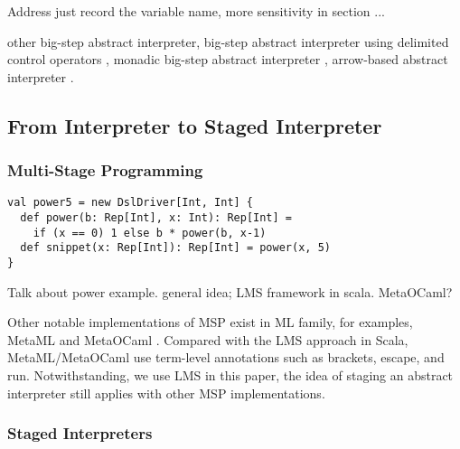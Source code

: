 Address just record the variable name, more sensitivity in section ...

other big-step abstract interpreter, 
big-step abstract interpreter using delimited control operators \cite{Wei:2018:RAA:3243631.3236800},
monadic big-step abstract interpreter \cite{DBLP:journals/pacmpl/DaraisLNH17},
arrow-based abstract interpreter \cite{Keidel:2018:CSP:3243631.3236767}.

\subsection{From Interpreter to Staged Interpreter} \label{stagedinterp}

\subsubsection{Multi-Stage Programming}
\begin{lstlisting}
val power5 = new DslDriver[Int, Int] {
  def power(b: Rep[Int], x: Int): Rep[Int] =
    if (x == 0) 1 else b * power(b, x-1)
  def snippet(x: Rep[Int]): Rep[Int] = power(x, 5)
}
\end{lstlisting}

Talk about power example. general idea; LMS framework in scala. MetaOCaml?

Other notable implementations of MSP exist in ML family, for examples, MetaML \cite{DBLP:conf/pepm/TahaS97} 
and MetaOCaml \cite{DBLP:conf/gpce/CalcagnoTHL03, DBLP:conf/flops/Kiselyov14}.
Compared with the LMS approach in Scala, MetaML/MetaOCaml use term-level annotations such as brackets, 
escape, and run. Notwithstanding, we use LMS in this paper, the idea of staging an abstract interpreter
still applies with other MSP implementations.

\subsubsection{Staged Interpreters} 
